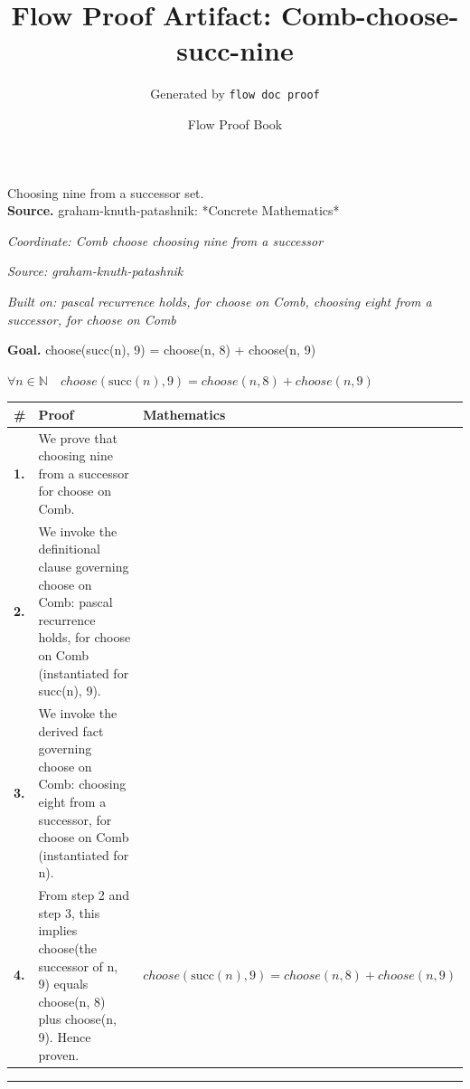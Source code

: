 \documentclass[11pt]{article}
\title{Flow Proof Artifact: Comb-choose-succ-nine}
\author{Generated by \texttt{flow doc proof}}
\date{Flow Proof Book}
\theoremstyle{definition}
\begin{document}
\maketitle
Choosing nine from a successor set.\\[0.5em]
\textbf{Source.} graham-knuth-patashnik: *Concrete Mathematics*\\[0.5em]
\bigskip
{}\par
\smallskip\noindent\textit{Coordinate: Comb \cdot choose \cdot choosing nine from a successor}\par
\smallskip\noindent\textit{Source: graham-knuth-patashnik}\par
\smallskip\noindent\textit{Built on: pascal recurrence holds, for choose on Comb, choosing eight from a successor, for choose on Comb}\par
\medskip
\noindent\textbf{Goal.} choose(succ(n), 9) = choose(n, 8) + choose(n, 9)\par
\noindent$\displaystyle \forall n \in \mathbb{N}\quad choose(\mathrm{succ}(n), 9) = choose(n, 8) + choose(n, 9)$\par
\medskip
\noindent
\begin{tabular}{@{} >{\raggedright\arraybackslash}p{} >{\raggedright\arraybackslash}p{} >{\raggedleft\arraybackslash}p{} @{}}
\textbf{\#} & \textbf{Proof} & \textbf{Mathematics} \\
\midrule
\textbf{1.} & We prove that choosing nine from a successor for choose on Comb. & \\[0.45em]
\textbf{2.} & We invoke the definitional clause governing choose on Comb: pascal recurrence holds, for choose on Comb (instantiated for succ(n), 9). & \\[0.45em]
\textbf{3.} & We invoke the derived fact governing choose on Comb: choosing eight from a successor, for choose on Comb (instantiated for n). & \\[0.45em]
\textbf{4.} & From step 2 and step 3, this implies choose(the successor of n, 9) equals choose(n, 8) plus choose(n, 9). Hence proven. & $\displaystyle choose(\mathrm{succ}(n), 9) = choose(n, 8) + choose(n, 9)$ \\[0.45em]
\bottomrule
\end{tabular}
\label{thm:Comb-choose-choosing_nine_from_a_successor}
\par\medskip\hrule
\end{document}
